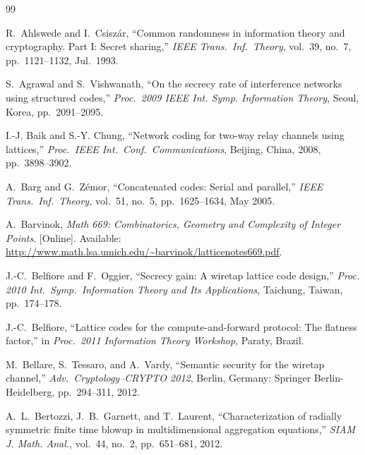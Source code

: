 \documentclass[main.tex]{subfiles}
\begin{document}
\begin{thebibliography}{99}

 R.\ Ahlswede and I.\ Csisz\'{a}r, ``Common randomness in information
theory and cryptography. Part I: Secret sharing,'' \emph{IEEE Trans.\ Inf.\ Theory}, vol.\ 39, no.\ 7, pp.\ 1121--1132, Jul.\ 1993.


S.~Agrawal and S.~Vishwanath, ``On the secrecy rate of interference networks using structured codes,'' \emph{Proc.\ 2009 IEEE Int. Symp. Information Theory}, Seoul, Korea, pp.\ 2091--2095.



I.-J. Baik and S.-Y. Chung, ``Network coding for two-way relay channels using
  lattices,'' \emph{Proc.\ IEEE Int.\ Conf.\ Communications}, Beijing, China, 2008, pp.\ 3898--3902.
 
A.\ Barg and G.\ Z\'{e}mor, ``Concatenated codes: Serial and parallel,'' \emph{IEEE Trans.\ Inf.\ Theory,} vol.\ 51, no.\ 5, pp.\ 1625--1634, May 2005.
  
A.~Barvinok, \emph{Math 669: Combinatorics, Geometry and Complexity of Integer Points}.
 [Online]. Available: \url{http://www.math.lsa.umich.edu/~barvinok/latticenotes669.pdf}.

 
 
J.-C.\ Belfiore and F.~Oggier, ``Secrecy gain: A wiretap lattice code design,''  \emph{Proc. 2010 Int.\ Symp.\ Information Theory and  Its Applications}, Taichung, Taiwan, pp.\ 174--178.

J.-C.\ Belfiore, ``Lattice codes for the compute-and-forward protocol: The flatness factor,'' 
in \emph{Proc.\ 2011 Information Theory Workshop}, Paraty, Brazil.

M.\ Bellare,  S.\ Tessaro, and A.\ Vardy, ``Semantic security for the wiretap channel,'' \emph{Adv.\ Cryptology--CRYPTO 2012}, Berlin, Germany: Springer Berlin-Heidelberg, pp.\ 294--311, 2012.

  A.\ L.\ Bertozzi, J.\ B.\ Garnett, and T.\ Laurent, 
 ``Characterization of radially symmetric finite time blowup in multidimensional aggregation equations,'' 
 \emph{SIAM J. Math. Anal.}, vol.\ 44, no.\ 2, pp.\ 651--681, 2012.
 

\end{thebibliography}
\end{document}
